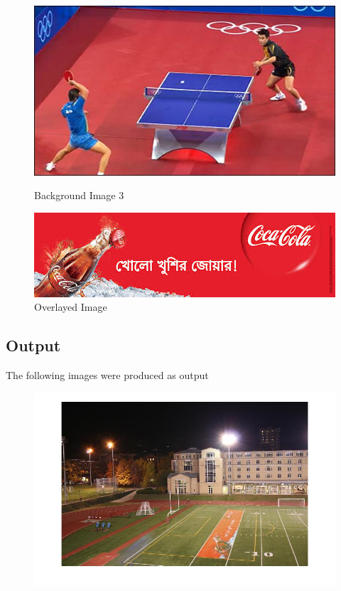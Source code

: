 \documentclass[12pt]{article}
\begin{document}
\begin{figure}[h]
\centering
\begin{minipage}{0.6\textwidth}
\centering
\includegraphics[scale = 0.45]{tabletennis.jpg}
\caption{Background Image 3}
\label{fig:Image 1}
\end{minipage}%
\begin{minipage}{.5\textwidth}
\centering
\includegraphics[scale = 0.45]{cocacola.jpg}
\caption{Overlayed Image}
\label{fig:Image 2}
\end{minipage}%
\end{figure}

\clearpage

   
\subsection{Output}
The following images were produced as output
\centering


\begin{figure}[htp]
\centering
\includegraphics[width=1\textwidth]{overlayField.jpg}\hfill
\end{figure}
\end{document}
